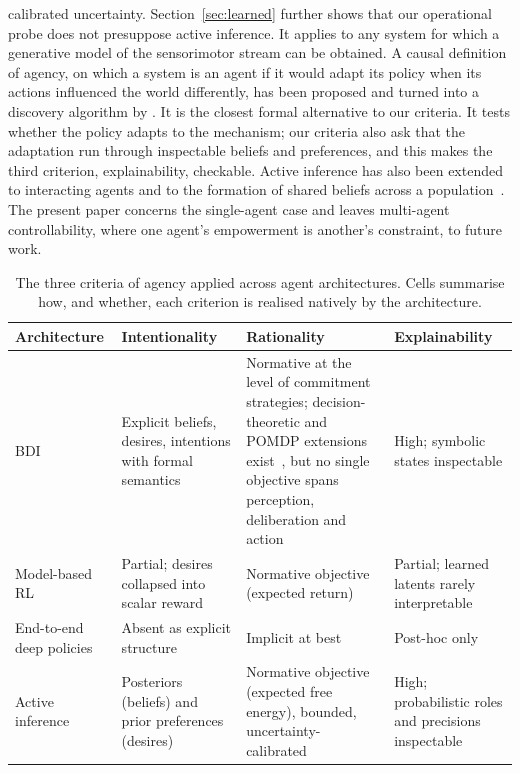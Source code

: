 \documentclass[pdflatex,sn-apa]{sn-jnl}%
\theoremstyle{definition}
\begin{document}
calibrated uncertainty. Section~\ref{sec:learned} further shows that our operational probe does not presuppose active inference. It applies to any system for which a generative model of the sensorimotor stream can be obtained. A causal definition of agency, on which a system is an agent if it would adapt its policy when its actions influenced the world differently, has been proposed and turned into a discovery algorithm by \citet{kentonDiscoveringAgents2023}. It is the closest formal alternative to our criteria. It tests whether the policy adapts to the mechanism; our criteria also ask that the adaptation run through inspectable beliefs and preferences, and this makes the third criterion, explainability, checkable. Active inference has also been extended to interacting agents and to the formation of shared beliefs across a population~\citep{albarracinEpistemicCommunities2022}. The present paper concerns the single-agent case and leaves multi-agent controllability, where one agent's empowerment is another's constraint, to future work.

\begin{table}[t]
\centering
{\small
\begin{tabular}{|p{2.2cm}|p{2.8cm}|p{2.8cm}|p{2.8cm}|}
\hline
\textbf{Architecture} & \textbf{Intentionality} & \textbf{Rationality} & \textbf{Explainability} \\
\hline
BDI~\citep{raoBDIAgents1995,wooldridgeReasoningRationalAgents2000} & Explicit beliefs, desires, intentions with formal semantics & Normative at the level of commitment strategies; decision-theoretic and POMDP extensions exist~\citep{schutIntentionReconsideration2004,nairHybridBDIPOMDP2005}, but no single objective spans perception, deliberation and action & High; symbolic states inspectable \\
\hline
Model-based RL~\citep{hansenTDMPC2ScalableRobust2024} & Partial; desires collapsed into scalar reward & Normative objective (expected return) & Partial; learned latents rarely interpretable \\
\hline
End-to-end deep policies & Absent as explicit structure & Implicit at best & Post-hoc only~\citep{arrietaExplainableAI2020} \\
\hline
Active inference & Posteriors (beliefs) and prior preferences (desires) & Normative objective (expected free energy), bounded, uncertainty-calibrated & High; probabilistic roles and precisions inspectable \\
\hline
\end{tabular}
}
\caption{The three criteria of agency applied across agent architectures. Cells summarise how, and whether, each criterion is realised natively by the architecture.}
\label{tab:frameworks}
\end{table}
\end{document}
